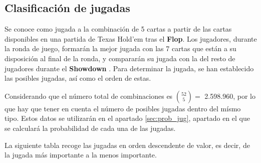 \subsection{Clasificación de jugadas}
\label{sec:class}

Se conoce como jugada a la combinación de 5 cartas a partir de las cartas disponibles en una partida de Texas Hold'em tras el \textbf{Flop}. Los jugadores, durante la ronda de juego, formarán la mejor jugada con las 7 cartas que están a su disposición al final de la ronda, y compararán su jugada con la del resto de jugadores durante el \textbf{Showdown} . Para determinar la jugada, se han establecido las posibles jugadas, así como el orden de estas.  \cite{bridge}

Considerando que el número total de combinaciones es $\binom{52}{5}=$ 2.598.960, por lo que hay que tener en cuenta el número de posibles jugadas dentro del mísmo tipo. Estos datos se utilizarán en el apartado \ref{sec:prob_jug}, apartado en el que se calculará la probabilidad de cada una de las jugadas.

La siguiente tabla recoge las jugadas en orden descendente de valor, es decir, de la jugada más importante a la menos importante. 

